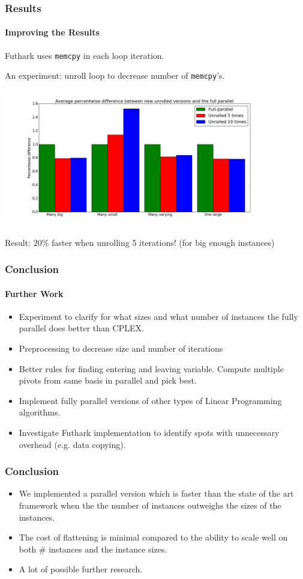 \documentclass{beamer}
\newcommand{\empr}[1]{\textcolor{CosRed}{ #1}}
\begin{document}
\begin{frame}[fragile]
\frametitle{Results}
\framesubtitle{Improving the Results}
\centering
Futhark uses \texttt{memcpy} in each loop iteration.

An experiment: unroll loop to decrease number of \texttt{memcpy}'s.

\pause

\includegraphics[width=0.9\textwidth]{../Doc/figures/unrolling}

 \empr{Result: 20\% faster when unrolling 5 iterations! {\tiny(for big enough instances)}}

\end{frame}



\begin{frame}
\frametitle{Conclusion}
\framesubtitle{Further Work}
\begin{itemize}
	\item Experiment to clarify for what sizes and what number of instances the fully parallel does better than CPLEX.
	\item Preprocessing to decrease size and number of iterations
	\item Better rules for finding entering and leaving variable. Compute multiple pivots from same basis in parallel and pick best.
	\item Implement fully parallel versions of other types of Linear Programming algorithms.
	\item Investigate Futhark implementation to identify spots with unnecessary overhead (e.g. data copying).
\end{itemize}
\end{frame}

\begin{frame}
\frametitle{Conclusion}
\begin{itemize}
	\item We implemented a parallel version which is faster than the state of the art framework when the the number of instances outweighs the sizes of the instances.
	\item The cost of flattening is minimal compared to the ability to scale well on both \# instances and the instance sizes.
	\item A lot of possible further research.
\end{itemize}
\end{frame}
\end{document}
